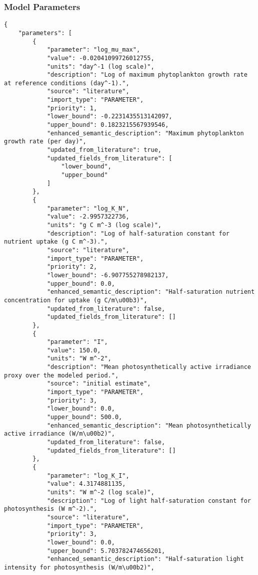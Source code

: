 \subsubsection{Model Parameters}
\begin{lstlisting}
{
    "parameters": [
        {
            "parameter": "log_mu_max",
            "value": -0.02041099726012755,
            "units": "day^-1 (log scale)",
            "description": "Log of maximum phytoplankton growth rate at reference conditions (day^-1).",
            "source": "literature",
            "import_type": "PARAMETER",
            "priority": 1,
            "lower_bound": -0.2231435513142097,
            "upper_bound": 0.1823215567939546,
            "enhanced_semantic_description": "Maximum phytoplankton growth rate (per day)",
            "updated_from_literature": true,
            "updated_fields_from_literature": [
                "lower_bound",
                "upper_bound"
            ]
        },
        {
            "parameter": "log_K_N",
            "value": -2.9957322736,
            "units": "g C m^-3 (log scale)",
            "description": "Log of half-saturation constant for nutrient uptake (g C m^-3).",
            "source": "literature",
            "import_type": "PARAMETER",
            "priority": 2,
            "lower_bound": -6.907755278982137,
            "upper_bound": 0.0,
            "enhanced_semantic_description": "Half-saturation nutrient concentration for uptake (g C/m\u00b3)",
            "updated_from_literature": false,
            "updated_fields_from_literature": []
        },
        {
            "parameter": "I",
            "value": 150.0,
            "units": "W m^-2",
            "description": "Mean photosynthetically active irradiance proxy over the modeled period.",
            "source": "initial estimate",
            "import_type": "PARAMETER",
            "priority": 3,
            "lower_bound": 0.0,
            "upper_bound": 500.0,
            "enhanced_semantic_description": "Mean photosynthetically active irradiance (W/m\u00b2)",
            "updated_from_literature": false,
            "updated_fields_from_literature": []
        },
        {
            "parameter": "log_K_I",
            "value": 4.3174881135,
            "units": "W m^-2 (log scale)",
            "description": "Log of light half-saturation constant for photosynthesis (W m^-2).",
            "source": "literature",
            "import_type": "PARAMETER",
            "priority": 3,
            "lower_bound": 0.0,
            "upper_bound": 5.703782474656201,
            "enhanced_semantic_description": "Half-saturation light intensity for photosynthesis (W/m\u00b2)",

\end{lstlisting}
